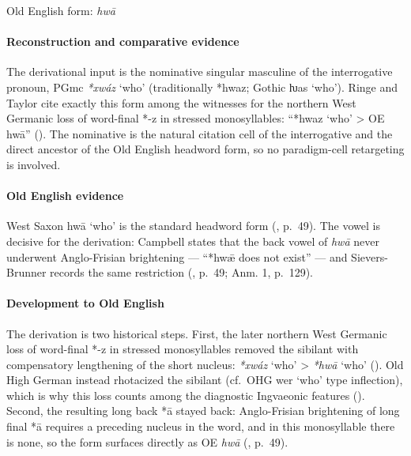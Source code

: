 \documentclass[
  british,
  a4paper,
]{article}
\newcounter{none} %
\providecommand{\Recon}[1]{\emph{*#1}}
\begin{document}
Old English form: \emph{hwā}

\paragraph{Reconstruction and comparative
evidence}\label{reconstruction-and-comparative-evidence-78}

The derivational input is the nominative singular masculine of the
interrogative pronoun, PGmc \Recon{xwáz} `who' (traditionally *hwaz;
Gothic {ƕas} `who'). Ringe and Taylor cite exactly this form among the
witnesses for the northern West Germanic loss of word-final *-z in
stressed monosyllables: ``*hwaz `who' \textgreater{} OE hwā''
(). The
nominative is the natural citation cell of the interrogative and the
direct ancestor of the Old English headword form, so no paradigm-cell
retargeting is involved.

\paragraph{Old English evidence}\label{old-english-evidence-80}

West Saxon {hwā} `who' is the standard headword form
(, p.~49). The
vowel is decisive for the derivation: Campbell states that the back
vowel of \emph{hwā} never underwent Anglo-Frisian brightening --- ``*hwǣ
does not exist'' --- and Sievers-Brunner records the same restriction
(, p.~49;
 Anm. 1,
p.~129).

\paragraph{Development to Old
English}\label{development-to-old-english-79}

The derivation is two historical steps. First, the later northern West
Germanic loss of word-final *-z in stressed monosyllables removed the
sibilant with compensatory lengthening of the short nucleus:
\Recon{xwáz} `who' \textgreater{} \Recon{hwā} `who'
(). Old High
German instead rhotacized the sibilant (cf.~OHG {wer} `who' type
inflection), which is why this loss counts among the diagnostic
Ingvaeonic features (). Second,
the resulting long back *ā stayed back: Anglo-Frisian brightening of
long final *ā requires a preceding nucleus in the word, and in this
monosyllable there is none, so the form surfaces directly as OE
\emph{hwā} (,
p.~49).
\end{document}
